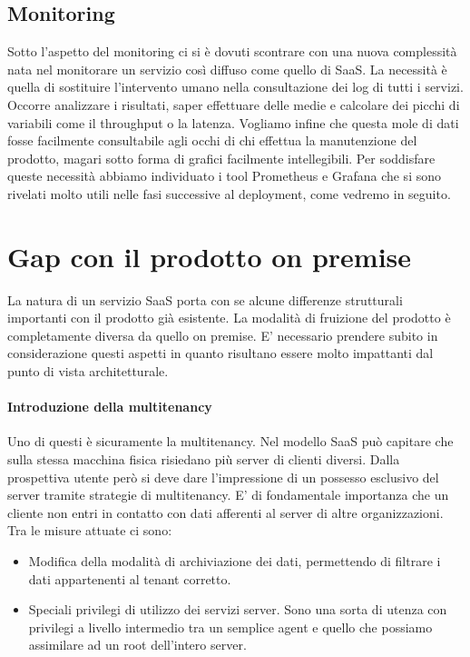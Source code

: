\subsection{Monitoring}
Sotto l'aspetto del monitoring ci si è dovuti scontrare con una nuova complessità nata nel monitorare un servizio così diffuso come quello di SaaS. La necessità è quella di sostituire l'intervento umano nella consultazione dei log di tutti i servizi. Occorre analizzare i risultati, saper effettuare delle medie e calcolare dei picchi di variabili come il throughput o la latenza. Vogliamo infine che questa mole di dati fosse facilmente consultabile agli occhi di chi effettua la manutenzione del prodotto, magari sotto forma di grafici facilmente intellegibili. Per soddisfare queste necessità abbiamo individuato i tool Prometheus e Grafana che si sono rivelati molto utili nelle fasi successive al deployment, come vedremo in seguito.  

\section{Gap con il prodotto on premise}
La natura di un servizio SaaS porta con se alcune differenze strutturali importanti con il prodotto già esistente. La modalità di fruizione del prodotto è completamente diversa da quello on premise. E' necessario prendere subito in considerazione questi aspetti in quanto risultano essere molto impattanti dal punto di vista architetturale.
\paragraph{Introduzione della multitenancy}
Uno di questi è sicuramente la multitenancy. Nel modello SaaS può capitare che sulla stessa macchina fisica risiedano più server di clienti diversi. Dalla prospettiva utente però si deve dare l'impressione di un possesso esclusivo del server tramite strategie di multitenancy. E' di fondamentale importanza che un cliente non entri in contatto con dati afferenti al server di altre organizzazioni. Tra le misure attuate ci sono:
\begin{itemize}
	\item Modifica della modalità di archiviazione dei dati, permettendo di filtrare i dati appartenenti al tenant corretto.
	\item Speciali privilegi di utilizzo dei servizi server. Sono una sorta di utenza con privilegi a livello intermedio tra un semplice agent e quello che possiamo assimilare ad un root dell'intero server.
\end{itemize}
